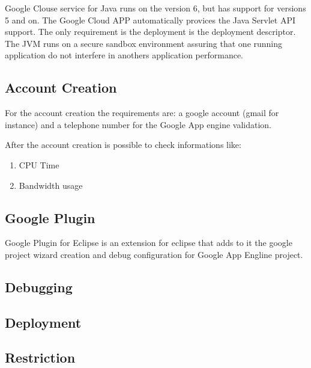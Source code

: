 \documentclass{article}
\begin{document}
Google Clouse service for Java runs on the version 6, but has support for versions 5 and on. The Google Cloud APP automatically provices the Java Servlet API support.
The only requirement is the deployment is the deployment descriptor. 
The JVM runs on a secure sandbox environment assuring that one running application do not interfere in anothers application performance.

\subsection{Account Creation}

For the account creation the requirements are: a google account (gmail for instance) and a telephone number for the Google App engine validation.

After the account creation is possible to check informations like:
\begin{enumerate}
\item CPU Time
\item Bandwidth usage
\end{enumerate}

\subsection{Google Plugin}

Google Plugin for Eclipse is an extension for eclipse that adds to it the google project wizard creation and debug configuration for Google App Engline project.

\subsection{Debugging}
\subsection{Deployment}
\subsection{Restriction}
\end{document}
